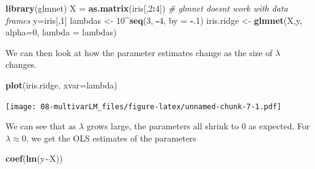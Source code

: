 \documentclass[
]{book}
\newenvironment{Shaded}{\begin{snugshade}}{\end{snugshade}}
\newcommand{\AttributeTok}[1]{\textcolor[rgb]{0.13,0.29,0.53}{#1}}
\newcommand{\CommentTok}[1]{\textcolor[rgb]{0.56,0.35,0.01}{\textit{#1}}}
\newcommand{\DecValTok}[1]{\textcolor[rgb]{0.00,0.00,0.81}{#1}}
\newcommand{\FunctionTok}[1]{\textcolor[rgb]{0.13,0.29,0.53}{\textbf{#1}}}
\newcommand{\NormalTok}[1]{#1}
\newcommand{\OtherTok}[1]{\textcolor[rgb]{0.56,0.35,0.01}{#1}}
\newcommand{\SpecialCharTok}[1]{\textcolor[rgb]{0.81,0.36,0.00}{\textbf{#1}}}
\newcommand{\StringTok}[1]{\textcolor[rgb]{0.31,0.60,0.02}{#1}}
\theoremstyle{definition}
\theoremstyle{definition}
\theoremstyle{definition}
\theoremstyle{definition}
\theoremstyle{remark}
\begin{document}
\begin{Shaded}
\begin{Highlighting}[]
\FunctionTok{library}\NormalTok{(glmnet)}
\NormalTok{X }\OtherTok{=} \FunctionTok{as.matrix}\NormalTok{(iris[,}\DecValTok{2}\SpecialCharTok{:}\DecValTok{4}\NormalTok{]) }\CommentTok{\# glmnet doesn\textquotesingle{}t work with data frames}
\NormalTok{y}\OtherTok{=}\NormalTok{iris[,}\DecValTok{1}\NormalTok{]}
\NormalTok{lambdas }\OtherTok{\textless{}{-}} \DecValTok{10}\SpecialCharTok{\^{}}\FunctionTok{seq}\NormalTok{(}\DecValTok{3}\NormalTok{, }\SpecialCharTok{{-}}\DecValTok{4}\NormalTok{, }\AttributeTok{by =} \SpecialCharTok{{-}}\NormalTok{.}\DecValTok{1}\NormalTok{)}
\NormalTok{iris.ridge }\OtherTok{\textless{}{-}} \FunctionTok{glmnet}\NormalTok{(X,y, }\AttributeTok{alpha=}\DecValTok{0}\NormalTok{, }\AttributeTok{lambda =}\NormalTok{ lambdas)}
\end{Highlighting}
\end{Shaded}

We can then look at how the parameter estimates change as the size of \(\lambda\) changes.

\begin{Shaded}
\begin{Highlighting}[]
\FunctionTok{plot}\NormalTok{(iris.ridge, }\AttributeTok{xvar=}\StringTok{\textquotesingle{}lambda\textquotesingle{}}\NormalTok{) }
\end{Highlighting}
\end{Shaded}

\texttt{[image: 08-multivarLM\_files/figure-latex/unnamed-chunk-7-1.pdf]}

\begin{Shaded}
\end{Shaded}

We can see that as \(\lambda\) grows large, the parameters all shrink to \(0\) as expected. For \(\lambda\approx 0\), we get the OLS estimates of the parameters

\begin{Shaded}
\begin{Highlighting}[]
\FunctionTok{coef}\NormalTok{(}\FunctionTok{lm}\NormalTok{(y}\SpecialCharTok{\textasciitilde{}}\NormalTok{X))}
\end{Highlighting}
\end{Shaded}
\end{document}
